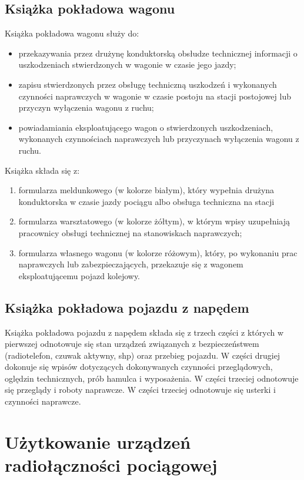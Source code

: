 \section{Książka pokładowa wagonu}
Książka pokładowa wagonu służy do:
\begin{itemize}
\item przekazywania przez drużynę konduktorską obsłudze technicznej informacji o uszkodzeniach stwierdzonych w wagonie w czasie jego jazdy;
\item zapisu stwierdzonych przez obsługę techniczną uszkodzeń i wykonanych czynności naprawczych w wagonie w czasie postoju na stacji postojowej lub przyczyn wyłączenia wagonu z ruchu;
\item powiadamiania eksploatującego wagon o stwierdzonych uszkodzeniach, wykonanych czynnościach naprawczych lub przyczynach wyłączenia wagonu z ruchu.
\end{itemize}
Książka składa się z:
\begin{enumerate}
\item formularza meldunkowego (w kolorze białym), który wypełnia drużyna konduktorska w czasie jazdy pociągu albo obsługa techniczna na stacji \item formularza warsztatowego (w kolorze żółtym), w którym wpisy uzupełniają pracownicy obsługi technicznej na stanowiskach naprawczych;
\item formularza własnego wagonu (w kolorze różowym), który, po wykonaniu prac naprawczych lub zabezpieczających, przekazuje się z wagonem eksploatującemu pojazd kolejowy.
\end{enumerate}

\section{Książka pokładowa pojazdu z napędem}

Książka pokładowa pojazdu z napędem składa się z trzech części z których w pierwszej odnotowuje się stan urządzeń związanych z bezpieczeństwem (radiotelefon, czuwak aktywny, shp) oraz przebieg pojazdu. W części drugiej dokonuje się wpisów dotyczących dokonywanych czynności przeglądowych, oględzin technicznych, prób hamulca i wyposażenia. W części trzeciej odnotowuje się przeglądy i roboty naprawcze. W części trzeciej odnotowuje się usterki i czynności naprawcze.

\chapter{Użytkowanie urządzeń radiołączności pociągowej}

